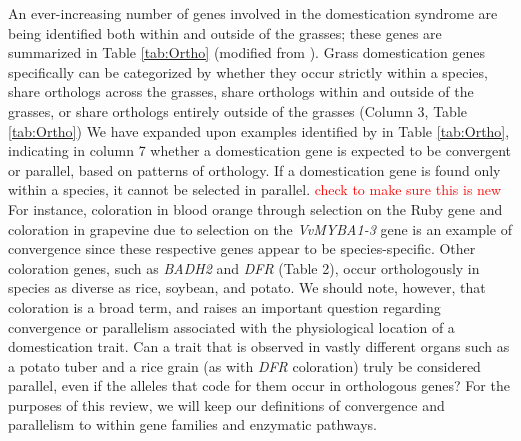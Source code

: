 \documentclass[12pt]{article}
\newcommand{\mbh}[1]{\textcolor{red}{\normalsize  #1}}
\begin{document}
An ever-increasing number of genes involved in the domestication syndrome are being identified both within and outside of the grasses; these genes are summarized in Table \ref{tab:Ortho} (modified from \citep{Lenser2013}).
Grass domestication genes specifically can be categorized by whether they occur strictly within a species, share orthologs across the grasses, share orthologs within and outside of the grasses, or share orthologs entirely outside of the grasses (Column 3, Table \ref{tab:Ortho})
We have expanded upon examples identified by \citep{Lenser2013} in Table \ref{tab:Ortho}, indicating in column 7 whether a domestication gene is expected to be convergent or parallel, based on patterns of orthology.
If a domestication gene is found only within a species, it cannot be selected in parallel. \mbh{check to make sure this is new}
For instance, coloration in blood orange through selection on the Ruby gene and coloration in grapevine due to selection on the \textit{VvMYBA1-3} gene is an example of convergence since these respective genes appear to be species-specific.
Other coloration genes, such as \textit{BADH2} and \textit{DFR} (Table 2), occur orthologously in species as diverse as rice, soybean, and potato.
We should note, however, that coloration is a broad term, and raises an important question regarding convergence or parallelism associated with the physiological location of a domestication trait.
Can a trait that is observed in vastly different organs such as a potato tuber and a rice grain (as with \textit{DFR} coloration) truly be considered parallel, even if the alleles that code for them occur in orthologous genes?
For the purposes of this review, we will keep our definitions of convergence and parallelism to within gene families and enzymatic pathways. 
\end{document}
